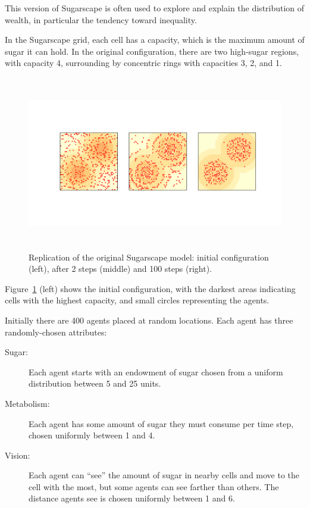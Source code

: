 \documentclass[12pt]{book}
\theoremstyle{exercise}
\begin{document}
This version of Sugarscape is often used to explore and explain the
distribution of wealth, in particular the tendency toward inequality.

In the Sugarscape grid, each cell has a capacity, which is the maximum
amount of sugar it can hold.  In the original configuration, there
are two high-sugar regions, with capacity 4, surrounding by concentric
rings with capacities 3, 2, and 1.

\begin{figure}
\centerline{\includegraphics[height=3in]{figs/chap09-3.pdf}}
\caption{Replication of the original Sugarscape model: initial
configuration (left), after 2 steps (middle) and 100 steps (right).}
\label{chap09-3}
\end{figure}

Figure~\ref{chap09-3} (left) shows the initial configuration, with the darkest
areas indicating cells with the highest capacity, and small circles
representing the agents.

Initially there are 400 agents placed at random locations.  Each
agent has three randomly-chosen attributes:

\begin{description}

\item[Sugar:] Each agent starts with an endowment of sugar chosen
from a uniform distribution between 5 and 25 units.

\item[Metabolism:] Each agent has some amount of sugar they must
consume per time step, chosen uniformly between 1 and 4.

\item[Vision:] Each agent can ``see'' the amount
of sugar in nearby cells and move to the cell with the most, but
some agents can see farther than others.  The distance agents
see is chosen uniformly between 1 and 6.

\end{description}
\end{document}
